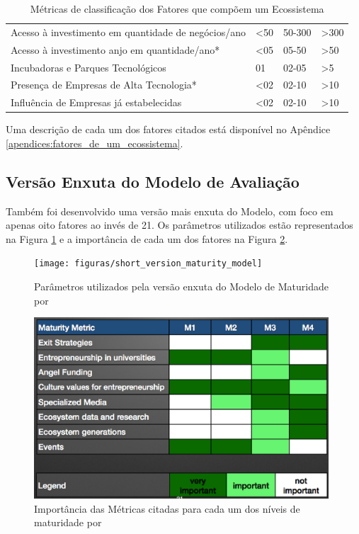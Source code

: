 \begin{table}[!htb]
\begin{tabular}{llll}
Acesso à investimento em quantidade de negócios/ano        &    <50     &   50-300   &    >300     \\
Acesso à investimento anjo em quantidade/ano*              &    <05     &   05-50    &    >50      \\
Incubadoras e Parques Tecnológicos                         &     01     &    02-05   &    >5       \\
Presença de Empresas de Alta Tecnologia*                   &    <02     &   02-10    &    >10      \\
Influência de Empresas já estabelecidas                    &    <02     &   02-10    &    >10      \\
\end{tabular}
\caption{Métricas de classificação dos Fatores que compõem um Ecossistema}
\label{table:metricas_de_classificacao_dos_fatores}
\end{table}

Uma descrição de cada um dos fatores citados está disponível no Apêndice \ref{apendices:fatores_de_um_ecossistema}.

\subsection{Versão Enxuta do Modelo de Avaliação}
\label{subsection:versao_enxuta_do_modelo_de_avaliacao}

Também foi desenvolvido uma versão mais enxuta do Modelo, com foco em apenas oito fatores ao invés de 21. Os parâmetros utilizados estão representados na Figura \ref{figure:short_version_maturity_model} e a importância de cada um dos fatores na Figura \ref{figure:metrics_importance}.

\begin{figure}[!htb]
\centering
\texttt{[image: figuras/short\_version\_maturity\_model]}
\caption{Parâmetros utilizados pela versão enxuta do Modelo de Maturidade por }
\label{figure:short_version_maturity_model}
\end{figure}

\begin{figure}[!htb]
\centering
\includegraphics[width=11cm,angle=0]{figuras/metrics_importance}
\caption{Importância das Métricas citadas para cada um dos níveis de maturidade por }
\label{figure:metrics_importance}
\end{figure}

